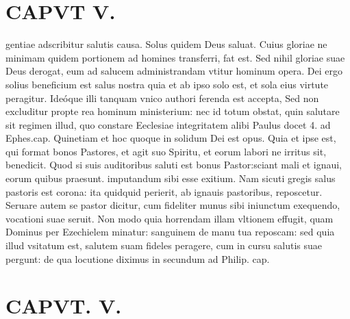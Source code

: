 \documentclass{article}
\begin{document}
\begin{pages}
\section*{CAPVT V. }
\marginpar{[ p.55 ]}\pstart gentiae adscribitur salutis causa. Solus quidem Deus saluat. Cuius gloriae ne minimam quidem portionem ad homines transferri, fat est. Sed nihil gloriae suae Deus derogat, eum ad salucem administrandam vtitur hominum opera. Dei ergo solius beneficium est salus nostra quia et ab ipso solo est, et sola eius virtute peragitur. Ideóque illi tanquam vnico authori ferenda est accepta, Sed non excluditur propte rea hominum ministerium: nec id totum obstat, quin salutare sit regimen illud, quo constare Eeclesiae integritatem alibi Paulus docet 4. ad Ephes.cap. Quinetiam et hoc quoque in solidum Dei est opus. Quia et ipse est, qui format bonos Pastores, et agit suo Spiritu, et eorum labori ne irritus sit, benedicit. Quod si suis auditoribus saluti est bonus Pastor:sciant mali et ignaui, eorum quibus praesunt. imputandum sibi esse exitium. Nam sicuti gregis salus pastoris est corona: ita quidquid perierit, ab ignauis pastoribus, reposcetur. Seruare autem se pastor dicitur, cum fideliter munus sibi iniunctum exequendo, vocationi suae seruit. Non modo quia horrendam illam vltionem effugit, quam Dominus per Ezechielem minatur: sanguinem de manu tua reposcam: sed quia illud vsitatum est, salutem suam fideles peragere, cum in cursu salutis suae pergunt: de qua locutione diximus in secundum ad Philip. cap.  \pend
\endnumbering\beginnumbering\section{CAPVT. V.}
{}

\end{pages}
\end{document}
